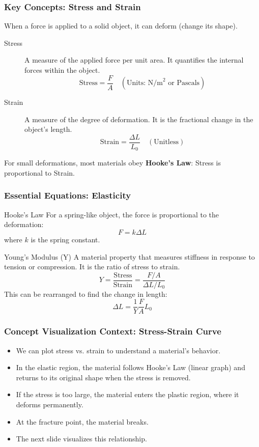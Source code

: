 \documentclass{beamer}
\begin{document}
\begin{frame}
\frametitle{Key Concepts: Stress and Strain}
When a force is applied to a solid object, it can deform (change its shape). \pause
\begin{description}
    \item[Stress] A measure of the applied force per unit area. It quantifies the internal forces within the object.
    \[ \text{Stress} = \frac{F}{A} \quad (\text{Units: N/m}^2 \text{ or Pascals}) \] \pause
    \item[Strain] A measure of the degree of deformation. It is the fractional change in the object's length.
    \[ \text{Strain} = \frac{\Delta L}{L_0} \quad (\text{Unitless}) \] \pause
\end{description}
For small deformations, most materials obey \textbf{Hooke's Law}: Stress is proportional to Strain.
\end{frame}

\begin{frame}
\frametitle{Essential Equations: Elasticity}
\begin{alertblock}{Hooke's Law}
For a spring-like object, the force is proportional to the deformation:
\[ F = k \Delta L \]
where $k$ is the spring constant.
\end{alertblock} \pause

\begin{exampleblock}{Young's Modulus (Y)}
A material property that measures stiffness in response to tension or compression. It is the ratio of stress to strain.
\[ Y = \frac{\text{Stress}}{\text{Strain}} = \frac{F/A}{\Delta L/L_0} \] \pause
This can be rearranged to find the change in length:
\[ \Delta L = \frac{1}{Y} \frac{F}{A} L_0 \]
\end{exampleblock}
\end{frame}

\begin{frame}
\frametitle{Concept Visualization Context: Stress-Strain Curve}
\begin{itemize}
    \item We can plot stress vs. strain to understand a material's behavior. \pause
    \item In the \alert{elastic region}, the material follows Hooke's Law (linear graph) and returns to its original shape when the stress is removed. \pause
    \item If the stress is too large, the material enters the \alert{plastic region}, where it deforms permanently. \pause
    \item At the \alert{fracture point}, the material breaks. \pause
    \item The next slide visualizes this relationship.
\end{itemize}
\end{frame}
\end{document}
